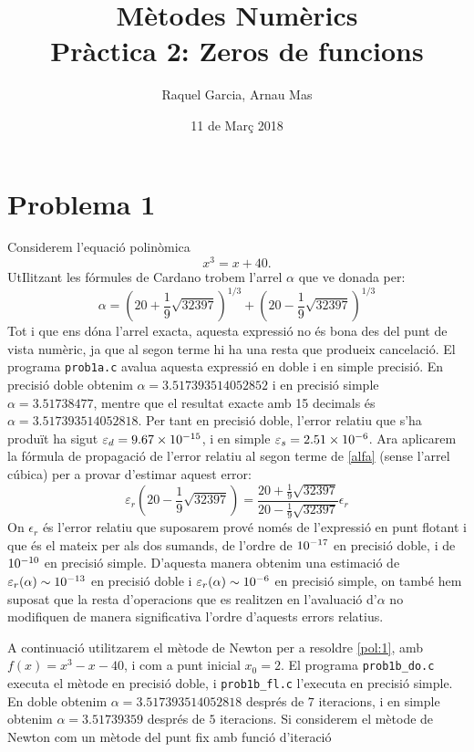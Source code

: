 \documentclass[12pt]{article}
\title{\textsf{\textbf{Mètodes Numèrics \\ Pràctica 2:} Zeros de funcions}}
\author{\textsf{Raquel Garcia, Arnau Mas}}
\date{\textsf{11 de Març 2018}}
\begin{document}
\maketitle
\section*{Problema 1}
Considerem l'equació polinòmica
\begin{equation}\label{pol:1}
	x^3=x+40.
\end{equation}
UtIlitzant les fórmules de Cardano trobem l'arrel $\alpha$ que ve donada per:
\begin{equation}\label{alfa}
	\alpha=\left(20+\frac{1}{9}\sqrt{32397} \right)^{1/3}+\left(20-\frac{1}{9}\sqrt{32397} \right)^{1/3}
\end{equation}
Tot i que ens dóna l'arrel exacta, aquesta expressió no és bona des del punt de vista numèric, ja que al segon terme hi ha una resta que produeix cancelació. El programa \texttt{prob1a.c} avalua aquesta expressió en doble i en simple precisió. En precisió doble obtenim $\alpha=\num{3.517393514052852}$ i en precisió simple $\alpha=\num{3.51738477}$, mentre que el resultat exacte amb 15 decimals és $\alpha=\num{3.517393514052818}$. Per tant en precisió doble, l'error relatiu que s'ha produït ha sigut $\varepsilon_d=\num{9.67d-15}$, i en simple $\varepsilon_s=\num{2.51d-6}$. Ara aplicarem la fórmula de propagació de l'error relatiu al segon terme de \eqref{alfa} (sense l'arrel cúbica) per a provar d'estimar aquest error:
\begin{equation}\label{errorrelatiu1}
	\varepsilon_r\left( 20-\frac{1}{9}\sqrt{32397}\right) =\dfrac{20+\frac{1}{9}\sqrt{32397}}{ 20-\frac{1}{9}\sqrt{32397}}\epsilon_r
\end{equation}
On $\epsilon_r$ és l'error relatiu que suposarem prové només de l'expressió en punt flotant i que és el mateix per als dos sumands, de l'ordre de $\num{d-17}$ en precisió doble, i de $\num{d-10}$ en precisió simple. D'aquesta manera obtenim una estimació de $\varepsilon_r(\alpha)\sim \num{d-13}$ en precisió doble  i $\varepsilon_r(\alpha)\sim \num{d-6}$ en precisió simple, on també hem suposat que la resta d'operacions que es realitzen en l'avaluació d'$\alpha$ no modifiquen de manera significativa l'ordre d'aquests errors relatius.

A continuació utilitzarem el mètode de Newton per a resoldre \eqref{pol:1}, amb $f(x)=x^3-x-40$, i com a punt inicial $x_0=2$. El programa \texttt{prob1b\_do.c} executa el mètode en precisió doble, i \texttt{prob1b\_fl.c} l'executa en precisió simple. En doble obtenim $\alpha=\num{3.517393514052818}$ després de $7$ iteracions, i en simple obtenim $\alpha=\num{3.51739359}$ després de $5$ iteracions. Si considerem el mètode de Newton com un mètode del punt fix amb funció d'iteració
\end{document}
